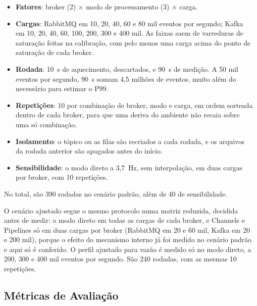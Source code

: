 \documentclass[12pt]{article}
\begin{document}
\begin{itemize}
  \item \textbf{Fatores}: broker (2) $\times$ modo de processamento (3) $\times$ carga.
  \item \textbf{Cargas}: RabbitMQ em 10, 20, 40, 60 e 80 mil eventos por segundo; Kafka
        em 10, 20, 40, 60, 100, 200, 300 e 400 mil. As faixas saem de varreduras de
        saturação feitas na calibração, com pelo menos uma carga acima do ponto de
        saturação de cada broker.
  \item \textbf{Rodada}: 10~s de aquecimento, descartados, e 90~s de medição. A 50 mil
        eventos por segundo, 90~s somam 4,5 milhões de eventos, muito além do necessário
        para estimar o P99.
  \item \textbf{Repetições}: 10 por combinação de broker, modo e carga, em ordem sorteada
        dentro de cada broker, para que uma deriva do ambiente não recaia sobre uma só
        combinação.
  \item \textbf{Isolamento}: o tópico ou as filas são recriados a cada rodada, e os
        arquivos da rodada anterior são apagados antes do início.
  \item \textbf{Sensibilidade}: o modo direto a 3,7~Hz, sem interpolação, em duas cargas
        por broker, com 10 repetições.
\end{itemize}

No total, são 390 rodadas no cenário padrão, além de 40 de sensibilidade.

O cenário ajustado segue o mesmo protocolo numa matriz reduzida, decidida antes de
medir: o modo direto em todas as cargas de cada broker, e Channels e Pipelines só em
duas cargas por broker (RabbitMQ em 20 e 60 mil, Kafka em 20 e 200 mil), porque o
efeito do mecanismo interno já foi medido no cenário padrão e aqui só é conferido. O
perfil ajustado para vazão é medido só no modo direto, a 200, 300 e 400 mil eventos por
segundo. São 240 rodadas, com as mesmas 10 repetições.

\subsection{Métricas de Avaliação}
\end{document}
